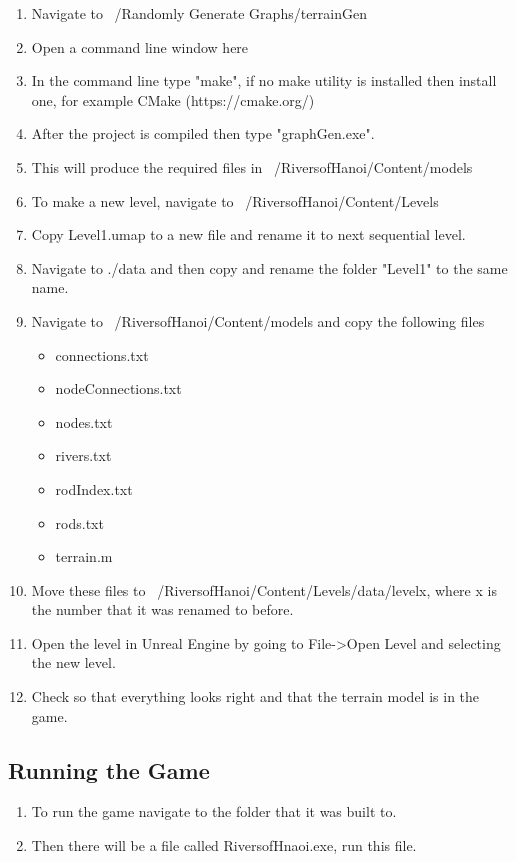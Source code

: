 \begin{appendices}
\begin{enumerate}
	\item Navigate to ~/Randomly Generate Graphs/terrainGen
	\item Open a command line window here
	\item In the command line type "make", if no make utility is installed then install one, for example CMake (https://cmake.org/)
	\item After the project is compiled then type "graphGen.exe".
	\item This will produce the required files in ~/RiversofHanoi/Content/models
	\item To make a new level, navigate to ~/RiversofHanoi/Content/Levels
	\item Copy Level1.umap to a new file and rename it to next sequential level.
	\item Navigate to ./data and then copy and rename the folder "Level1" to the same name.
	\item Navigate to ~/RiversofHanoi/Content/models and copy the following files
	\begin{itemize}
		\item connections.txt
		\item nodeConnections.txt
		\item nodes.txt
		\item rivers.txt
		\item rodIndex.txt
		\item rods.txt
		\item terrain.m
	\end{itemize}
	\item Move these files to ~/RiversofHanoi/Content/Levels/data/levelx, where x is the number that it was renamed to before.
	\item Open the level in Unreal Engine by going to File->Open Level and selecting the new level.
	\item Check so that everything looks right and that the terrain model is in the game.
\end{enumerate}

\subsection{Running the Game}

\begin{enumerate}
	\item To run the game navigate to the folder that it was built to.
	\item Then there will be a file called RiversofHnaoi.exe, run this file.
\end{enumerate}


\end{appendices}
